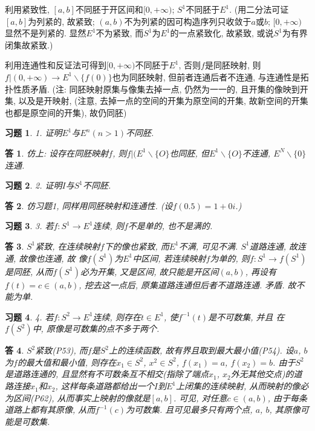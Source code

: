 \documentclass{ctexart}%
\newtheorem*{exercise}{习题}
\newtheorem*{solution}{答}
\theoremstyle{definition}
\theoremstyle{remark}
\begin{document}
利用紧致性, $[a,b]$不同胚于开区间和$[0,+\infty)$; $S^1$不同胚于$E^1$. (用二分法可证$[a,b]$为列紧的, 故紧致; $(a,b)$不为列紧的因可构造序列只收敛于$a$或$b$; $[0,+\infty)$显然不是列紧的. 显然$E^1$不为紧致, 而$S^1$为$E^1$的一点紧致化, 故紧致, 或说$S^1$为有界闭集故紧致.)

利用连通性和反证法可得到$[0,+\infty)$不同胚于$E^1$, 否则$f$是同胚映射, 则$f|(0,+\infty)\rightarrow
E^1\backslash \{f(0)\}$也为同胚映射, 但前者连通后者不连通, 与连通性是拓扑性质矛盾. (注: 同胚映射原集与像集去掉一点, 仍然为一一的, 且开集的像映到开集, 以及是开映射, (注意, 去掉一点的空间的开集为原空间的开集, 故新空间的开集也都是原空间的开集), 故仍同胚) 

\begin{exercise}1. 证明$E^1$与$E^n(n>1)$不同胚.
\end{exercise}
\begin{solution}仿上: 设存在同胚映射$f$, 则$f|(E^1\backslash \{O\}$也同胚, 但$E^1\backslash\{O\}$不连通, $E^N\backslash \{0\}$连通.
\end{solution}

\begin{exercise}2. 证明$I$与$S^1$不同胚.
\end{exercise}
\begin{solution}仿习题1, 同样用同胚映射和连通性. (设$f(0.5)=1+0i$.)
\end{solution}

\begin{exercise}3. 若$f: S^1\rightarrow E^1$连续, 则$f$不是单的, 也不是满的.
\end{exercise}
\begin{solution}
$S^1$紧致, 在连续映射$f$下的像也紧致, 而$E^1$不满, 可见不满. $S^1$道路连通, 故连通, 故像也连通, 故
像$f(S^1)$为$E^1$中区间, 若连续映射$f$为单的, 则$f: S^1\rightarrow f(S^1)$是同胚, 从而$f(S^1)$必为开集, 又是区间, 故只能是开区间$(a,b)$, 再设有$f(t)=c\in (a,b)$, 挖去这一点后, 原集道路连通但后者不道路连通. 矛盾. 故不能为单.
\end{solution}

\begin{exercise}4. 若$f: S^2\rightarrow E^1$连续, 则存在$t\in E^1$, 使$f^{-1}(t)$是不可数集, 并且
在$f(S^2)$中, 原像是可数集的点不多于两个. 
\end{exercise}
\begin{solution}$S^2$紧致(P53), 而$f$是$S^2$上的连续函数, 故有界且取到最大最小值(P54). 设$a$, $b$为$f$的最大值和最小值, 则存在$x_1\in S^2$, $x^2\in S^2$, $f(x_1)=a$, $f(x_2)=b$. 由于$S^2$是道路连通的, 且显然有不可数条互不相交(指除了端点$x_1$, $x_2$外无其他交点)的道路连接$x_1$和$x_2$, 这样每条道路都给出一个$I$到$E^1$上闭集的连续映射, 从而映射的像必为区间(P62), 从而事实上映射的像就是$[a,b]$. 可见, 对任意$c\in (a,b)$, 由于每条道路上都有其原像, 从而$f^{-1}(c)$为可数集. 且可见最多只有两个点, $a$, $b$, 其原像可能是可数集.   
\end{solution}
\end{document}
